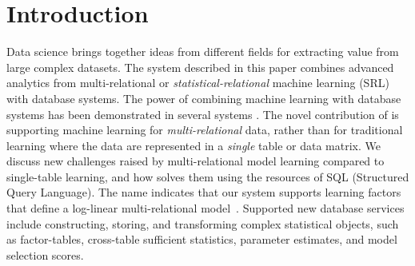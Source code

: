 \section{Introduction} Data science brings together ideas from different fields for extracting value from large complex datasets. The system described in this paper combines advanced analytics from multi-relational or {\em statistical-relational} machine learning (SRL) with database systems. The power of combining machine learning with database systems has been demonstrated in several systems 
%
\cite{Deshpande2006,MADlib_VLDB_2012,MLbase_ICDR_2013}.
The novel contribution of \FB is supporting machine learning for {\em multi-relational} data, rather than for traditional learning where the  data are represented in a {\em single} table or data matrix. 
%
We discuss new challenges raised by multi-relational model learning compared to single-table learning, and how \FB solves them using the resources of SQL (Structured Query Language). The name \FB indicates that our system supports learning factors that define a log-linear multi-relational model~\cite{Kimmig2015}. Supported new database services include constructing, storing, and transforming complex statistical objects, such as factor-tables, cross-table sufficient statistics, parameter estimates, and model selection scores.

